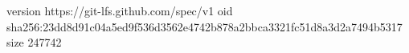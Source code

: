 version https://git-lfs.github.com/spec/v1
oid sha256:23dd8d91c04a5ed9f536d3562e4742b878a2bbca3321fc51d8a3d2a7494b5317
size 247742
